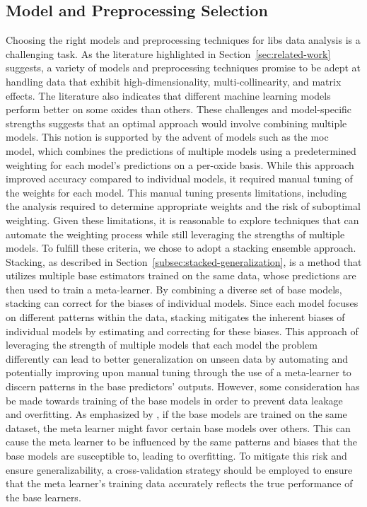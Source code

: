 \subsection{Model and Preprocessing Selection}

Choosing the right models and preprocessing techniques for \gls{libs} data analysis is a challenging task. 
As the literature highlighted in Section~\ref{sec:related-work} suggests, a variety of models and preprocessing techniques promise to be adept at handling data that exhibit high-dimensionality, multi-collinearity, and matrix effects.
The literature also indicates that different machine learning models perform better on some oxides than others.
These challenges and model-specific strengths suggests that an optimal approach would involve combining multiple models. 
This notion is supported by the advent of models such as the \gls{moc}~\cite{cleggRecalibrationMarsScience2017} model, which combines the predictions of multiple models using a predetermined weighting for each model's predictions on a per-oxide basis.
While this approach improved accuracy compared to individual models, it required manual tuning of the weights for each model.
This manual tuning presents limitations, including the analysis required to determine appropriate weights and the risk of suboptimal weighting.
Given these limitations, it is reasonable to explore techniques that can automate the weighting process while still leveraging the strengths of multiple models.
To fulfill these criteria, we chose to adopt a stacking ensemble approach. 
Stacking, as described in Section~\ref{subsec:stacked-generalization}, is a method that utilizes multiple base estimators trained on the same data, whose predictions are then used to train a meta-learner.
By combining a diverse set of base models, stacking can correct for the biases of individual models.
Since each model focuses on different patterns within the data, stacking mitigates the inherent biases of individual models by estimating and correcting for these biases.
This approach of leveraging the strength of multiple models that each model the problem differently can lead to better generalization on unseen data by automating and potentially improving upon manual tuning through the use of a meta-learner to discern patterns in the base predictors' outputs. \cite{wolpertstacked_1992, survey_of_ensemble_learning}
However, some consideration has be made towards training of the base models in order to prevent data leakage and overfitting.
As emphasized by \citet{cvstacking}, if the base models are trained on the same dataset, the meta learner might favor certain base models over others.
This can cause the meta learner to be influenced by the same patterns and biases that the base models are susceptible to, leading to overfitting.
To mitigate this risk and ensure generalizability, a cross-validation strategy should be employed to ensure that the meta learner's training data accurately reflects the true performance of the base learners.

